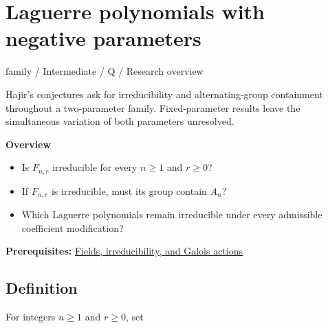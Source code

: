 \documentclass[11pt,a4paper,oneside,openany]{book}
\begin{document}
\chapter{Laguerre polynomials with negative parameters}\label{article:laguerre-negative-parameters}\hypertarget{article:laguerre-negative-parameters}{}\color{black}
{\sffamily\small\color{atlasgold}family / Intermediate / Q / Research overview}\par\medskip
Hajir's conjectures ask for irreducibility and alternating-group containment throughout a two-parameter family. Fixed-parameter results leave the simultaneous variation of both parameters unresolved.\par\medskip
\textbf{Overview}\begin{itemize}
\item Is \(F_{n,r}\) irreducible for every \(n\ge1\) and \(r\ge0\)?
\item If \(F_{n,r}\) is irreducible, must its group contain \(A_n\)?
\item Which Laguerre polynomials remain irreducible under every admissible coefficient modification?
\end{itemize}
{\small\textbf{Prerequisites:} \hyperlink{article:foundations}{Fields, irreducibility, and Galois actions}}\par
{}\section{Definition}
\color{black} For integers \(n\ge1\) and \(r\ge0\), set\par
\end{document}
